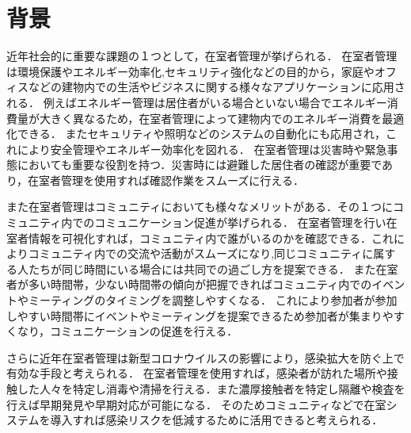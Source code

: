 





\section{背景}\label{1.1}
近年社会的に重要な課題の１つとして，在室者管理が挙げられる．
在室者管理は環境保護やエネルギー効率化,セキュリティ強化などの目的から，家庭やオフィスなどの建物内での生活やビジネスに関する様々なアプリケーションに応用される．
例えばエネルギー管理は居住者がいる場合といない場合でエネルギー消費量が大きく異なるため，在室者管理によって建物内でのエネルギー消費を最適化できる．
またセキュリティや照明などのシステムの自動化にも応用され，これにより安全管理やエネルギー効率化を図れる．
在室者管理は災害時や緊急事態においても重要な役割を持つ．災害時には避難した居住者の確認が重要であり，在室者管理を使用すれば確認作業をスムーズに行える．

また在室者管理はコミュニティにおいても様々なメリットがある．その１つにコミュニティ内でのコミュニケーション促進が挙げられる．
在室者管理を行い在室者情報を可視化すれば，コミュニティ内で誰がいるのかを確認できる．これによりコミュニティ内での交流や活動がスムーズになり,同じコミュニティに属する人たちが同じ時間にいる場合には共同での過ごし方を提案できる．
また在室者が多い時間帯，少ない時間帯の傾向が把握できればコミュニティ内でのイベントやミーティングのタイミングを調整しやすくなる．
これにより参加者が参加しやすい時間帯にイベントやミーティングを提案できるため参加者が集まりやすくなり，コミュニケーションの促進を行える．

さらに近年在室者管理は新型コロナウイルスの影響により，感染拡大を防ぐ上で有効な手段と考えられる．
在室者管理を使用すれば，感染者が訪れた場所や接触した人々を特定し消毒や清掃を行える．また濃厚接触者を特定し隔離や検査を行えば早期発見や早期対応が可能になる．
そのためコミュニティなどで在室システムを導入すれば感染リスクを低減するために活用できると考えられる．


